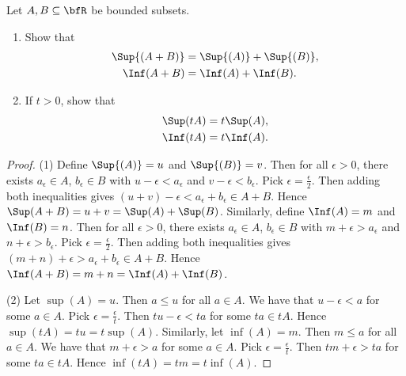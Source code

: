 \documentclass[10pt,twoside,openany]{memoir}
\begin{document}
    \begin{exercise}
        Let $A,B \subseteq \bfR$ be bounded subsets.
            \begin{enumerate}[label = (\arabic*)]
                \item Show that
                    \begin{equation*}
                    \begin{split}
                        \Sup{(A+B)} &= \Sup{(A)} + \Sup{(B)}, \\
                        \Inf(A+B) &= \Inf(A) + \Inf(B).
                    \end{split}
                    \end{equation*}
                \item If $t>0$, show that 
                    \begin{equation*}
                    \begin{split}
                        \Sup(tA) &= t \Sup(A), \\
                        \Inf(tA) &= t \Inf(A).
                    \end{split}
                    \end{equation*}
            \end{enumerate}
                {\color{red} \begin{proof}
                    (1) Define $\Sup{(A)} = u$ and $\Sup{(B)} = v$. Then for all $\epsilon > 0$, there exists $a_\epsilon \in A$, $b_\epsilon \in B$ with $u - \epsilon < a_\epsilon$ and $v - \epsilon < b_\epsilon$. Pick $\epsilon = \frac{\epsilon}{2}$. Then adding both inequalities gives $(u + v) - \epsilon < a_\epsilon + b_\epsilon \in A+B$. Hence $\Sup(A+B) = u + v = \Sup(A) + \Sup(B)$. Similarly, define $\Inf(A) = m$ and $\Inf(B) = n$. Then for all $\epsilon > 0$, there exists $a_\epsilon \in A$, $b_\epsilon \in B$ with $m + \epsilon > a_\epsilon$ and $n + \epsilon > b_\epsilon$. Pick $\epsilon = \frac{\epsilon}{2}$. Then adding both inequalities gives $(m+n)+\epsilon > a_\epsilon + b_\epsilon \in A+B$. Hence $\Inf(A+B) = m + n = \Inf(A) + \Inf(B)$.

                    (2) Let $\sup(A) = u$. Then $a \leq u $ for all $a \in A$. We have that $u - \epsilon < a$ for some $a \in A$. Pick $\epsilon = \frac{\epsilon}{t}$. Then $t u - \epsilon < ta$ for some $t a \in tA$. Hence $\sup(tA) = tu = t\sup(A)$. Similarly, let $\inf(A) = m$. Then $m \leq a$ for all $a \in A$. We have that $m+\epsilon > a$ for some $a \in A$. Pick $\epsilon = \frac{\epsilon}{t}$. Then $tm + \epsilon > ta$ for some $ta \in tA$. Hence $\inf(tA) = tm = t\inf(A)$.
                \end{proof}}
    \end{exercise}
\end{document}
